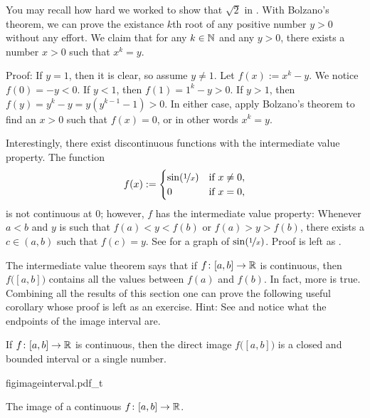 \begin{example}
You may recall how hard we worked to show that $\sqrt{2}$ in .
With Bolzano's
theorem, we can prove the existance $k$th root of any positive number $y >
0$ without any effort.  We claim that for any $k \in {\mathbb{N}}$ and any $y > 0$,
there exists a number $x > 0$ such that $x^k = y$.

Proof: If $y=1$, then it is clear, so assume $y\not= 1$.
Let $f(x) := x^k - y$.  We notice $f(0) = -y < 0$.
If $y < 1$, then $f(1) = 1^k -y > 0$.  If $y > 1$,
then $f(y) = y^k-y = y(y^{k-1}-1) > 0$.
In either case, apply Bolzano's theorem to find an $x > 0$ such that $f(x) = 0$,
or in other words $x^k = y$.
\end{example}

\begin{example}
Interestingly,
there exist discontinuous functions with
the intermediate value property.
The function
\begin{equation*}
f(x) :=
\begin{cases}
\sin(\nicefrac{1}{x}) & \text{if } x \not= 0, \\
0 & \text{if } x=0,
\end{cases}
\end{equation*}
is not continuous at $0$; however, $f$ has the intermediate value property:
Whenever $a < b$ and $y$ is such that $f(a) < y < f(b)$
or $f(a) > y > f(b)$,
there exists a $c \in (a,b)$ such that $f(c) = y$.
See  for a graph of $\sin(\nicefrac{1}{x})$.
Proof is left as .
\end{example}

The intermediate value theorem says that if $f \colon [a,b] \to {\mathbb{R}}$ is
continuous, then $f\bigl([a,b]\bigr)$ contains all the values between $f(a)$ and
$f(b)$.  In fact, more is true.  Combining all the results of this section
one can prove the following useful corollary whose proof is left as an exercise.
Hint: See  and notice what the endpoints of the
image interval are.

\begin{cor} \label{cor:imageofinterval}
If $f \colon [a,b] \to {\mathbb{R}}$ is continuous, then the direct image
$f\bigl([a,b]\bigr)$
is a closed and bounded interval or a single number.
\end{cor}

\begin{myfigureht}
{figimageinterval.pdf_t}
\caption{The image of a continuous $f \colon [a,b] \to {\mathbb{R}}$.\label{fig:imageinterval}}
\end{myfigureht}


